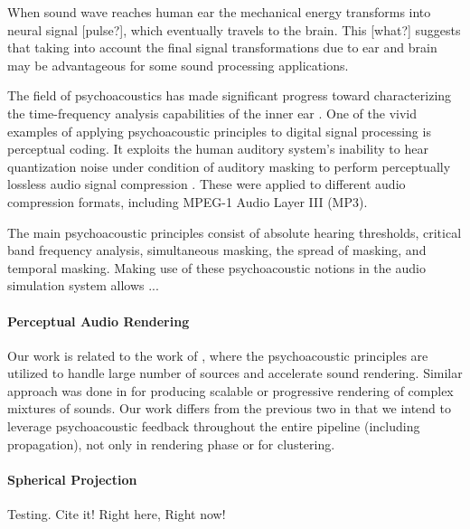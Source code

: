 When sound wave reaches human ear the mechanical energy transforms into neural signal [pulse?], which eventually travels to the brain. This [what?] suggests that taking into account the final signal transformations due to ear and brain may be advantageous for some sound processing applications.

The field of psychoacoustics has made significant progress toward characterizing the time-frequency analysis capabilities of the inner ear \cite{painter2000perceptual}. One of the vivid examples of applying psychoacoustic principles to digital signal processing is perceptual coding. It exploits the human auditory system's inability to hear quantization noise under condition of auditory masking \cite{pan1995tutorial} to perform perceptually lossless audio signal compression \cite{ambikairajah1997auditory}. These were applied to different audio compression formats, including MPEG-1 Audio Layer III (MP3).

The main psychoacoustic principles consist of absolute hearing thresholds, critical band frequency analysis, simultaneous masking, the spread of masking, and temporal masking. Making use of these psychoacoustic notions in the audio simulation system allows ...  



\paragraph{Perceptual Audio Rendering} 

Our work is related to the work of \cite{tsingos2004perceptual}, where the psychoacoustic principles are utilized to handle large number of sources and accelerate sound rendering.
Similar approach was done in \cite{moeck2007progressive} for producing scalable or progressive rendering of complex mixtures of sounds.
Our work differs from the previous two in that we intend to leverage psychoacoustic feedback throughout the entire pipeline (including propagation), not only in rendering phase or for clustering.


 \paragraph{Spherical Projection}  Testing. Cite it! Right here, Right now!